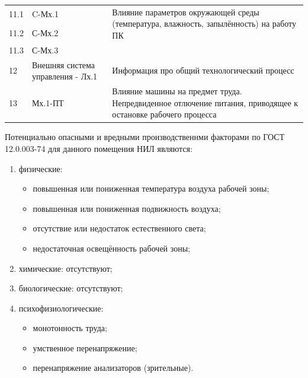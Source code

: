 \begin{table}
\begin{tabular}{| m{1.3cm} | m{2.3cm} | m{11.7cm} |}
        11.1        & C-Мх.1                & \multirow{2}{*}{\vbox{Влияние параметров окружающей среды (температура, влажность, запылённость) на работу ПК}} \\ \cline{1-2}
        11.2        & С-Мх.2                & \\ \cline{1-2}
        11.3        & С-Мх.3                & \\ \hline
        12          & Внешняя система управления - Лх.1 & Информация про общий технологический процесс                                                    \\ \hline
        13          & Мх.1-ПТ               & Влияние машины на предмет труда. Непредвиденное отлючение питания, приводящее к остановке рабочего процесса \\ \hline
    \end{tabular}
\end{table}

Потенциально опасными и вредными производственнми факторами по ГОСТ 12.0.003-74
для данного помещения НИЛ являются:

\begin{enumerate}

    \item физические:

    \begin{itemize}

        \item повышенная или пониженная температура воздуха рабочей зоны;
        
        \item повышенная или пониженная подвижность воздуха;
        
        \item отсутствие или недостаток естественного света;
        
        \item недостаточная освещённость рабочей зоны;
        
    \end{itemize}

    \item химические: отсутствуют;
   
    \item биологические: отсутствуют;
    
    \item психофизиологические:

    \begin{itemize}

        \item монотонность труда;

        \item умственное перенапряжение;

        \item перенапряжение анализаторов (зрительные).

    \end{itemize}

\end{enumerate}

